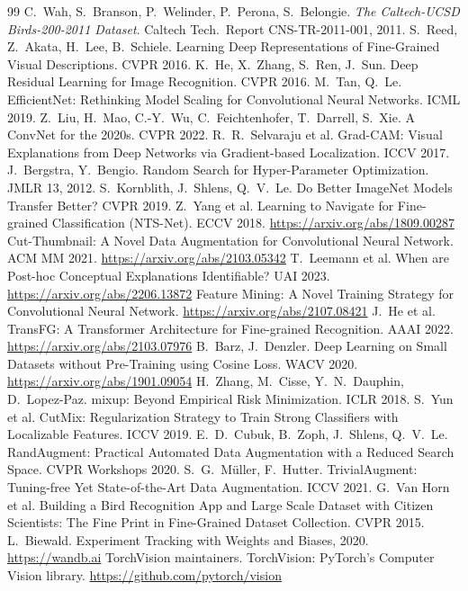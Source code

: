 \documentclass[11pt,a4paper]{article}
\begin{document}
\begin{thebibliography}{99}\small
{} C.~Wah, S.~Branson, P.~Welinder, P.~Perona, S.~Belongie. \emph{The Caltech-UCSD Birds-200-2011 Dataset}. Caltech Tech.\ Report CNS-TR-2011-001, 2011.
 S.~Reed, Z.~Akata, H.~Lee, B.~Schiele. Learning Deep Representations of Fine-Grained Visual Descriptions. CVPR 2016.
 K.~He, X.~Zhang, S.~Ren, J.~Sun. Deep Residual Learning for Image Recognition. CVPR 2016.
 M.~Tan, Q.~Le. EfficientNet: Rethinking Model Scaling for Convolutional Neural Networks. ICML 2019.
 Z.~Liu, H.~Mao, C.-Y.~Wu, C.~Feichtenhofer, T.~Darrell, S.~Xie. A ConvNet for the 2020s. CVPR 2022.
 R.~R.~Selvaraju et al. Grad-CAM: Visual Explanations from Deep Networks via Gradient-based Localization. ICCV 2017.
 J.~Bergstra, Y.~Bengio. Random Search for Hyper-Parameter Optimization. JMLR 13, 2012.
 S.~Kornblith, J.~Shlens, Q.~V.~Le. Do Better ImageNet Models Transfer Better? CVPR 2019.
 Z.~Yang et al. Learning to Navigate for Fine-grained Classification (NTS-Net). ECCV 2018. \url{https://arxiv.org/abs/1809.00287}
 Cut-Thumbnail: A Novel Data Augmentation for Convolutional Neural Network. ACM MM 2021. \url{https://arxiv.org/abs/2103.05342}
 T.~Leemann et al. When are Post-hoc Conceptual Explanations Identifiable? UAI 2023. \url{https://arxiv.org/abs/2206.13872}
 Feature Mining: A Novel Training Strategy for Convolutional Neural Network. \url{https://arxiv.org/abs/2107.08421}
 J.~He et al. TransFG: A Transformer Architecture for Fine-grained Recognition. AAAI 2022. \url{https://arxiv.org/abs/2103.07976}
 B.~Barz, J.~Denzler. Deep Learning on Small Datasets without Pre-Training using Cosine Loss. WACV 2020. \url{https://arxiv.org/abs/1901.09054}
 H.~Zhang, M.~Cisse, Y.~N.~Dauphin, D.~Lopez-Paz. mixup: Beyond Empirical Risk Minimization. ICLR 2018.
 S.~Yun et al. CutMix: Regularization Strategy to Train Strong Classifiers with Localizable Features. ICCV 2019.
 E.~D.~Cubuk, B.~Zoph, J.~Shlens, Q.~V.~Le. RandAugment: Practical Automated Data Augmentation with a Reduced Search Space. CVPR Workshops 2020.
 S.~G.~M\"uller, F.~Hutter. TrivialAugment: Tuning-free Yet State-of-the-Art Data Augmentation. ICCV 2021.
 G.~Van Horn et al. Building a Bird Recognition App and Large Scale Dataset with Citizen Scientists: The Fine Print in Fine-Grained Dataset Collection. CVPR 2015.
 L.~Biewald. Experiment Tracking with Weights and Biases, 2020. \url{https://wandb.ai}
 TorchVision maintainers. TorchVision: PyTorch's Computer Vision library. \url{https://github.com/pytorch/vision}
\end{thebibliography}
\end{document}
